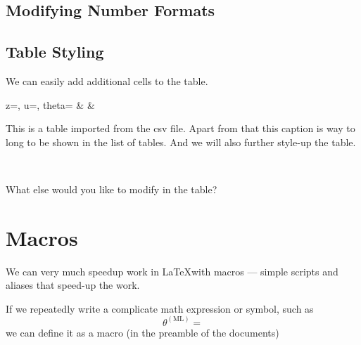 \documentclass[a4paper,10pt]{report} %
\begin{document}
\subsection{Modifying Number Formats}

\subsection{Table Styling}

  We can easily add additional cells to the table.
  
  \begin{table}[h!] \label{tab:styled}
  \begin{center}
  {  z=\zvec, u=\uvec, theta=\thvec    %
  }{%
     \zvec  & \uvec & \thvec        %
  } %
  \caption[short table description]{This is a table imported from the csv file. Apart from that this caption is way to long to be shown in the list of tables. And we will also further style-up the table. }
  \end{center}
\end{table} ~\vspace{1ex}
  
  What else would you like to modify in the table?

\newpage
\section{Macros}
We can very much speedup work in \LaTeX with  macros --- simple scripts and aliases that speed-up the work.

If we repeatedly write a complicate math expression or symbol, such as
\[ \theta^{\scriptscriptstyle \mathrm{(ML)}} =  \]
we can define  it as a macro (in the preamble of the documents)
\end{document}
